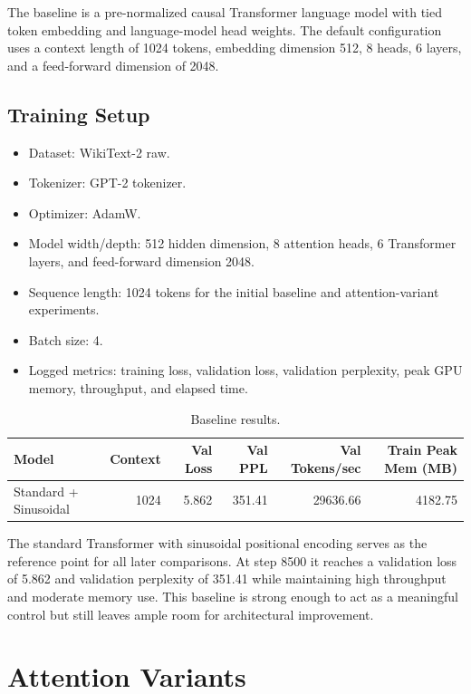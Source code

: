 \documentclass{article}
\begin{document}
The baseline is a pre-normalized causal Transformer language model with tied
token embedding and language-model head weights. The default configuration uses
a context length of 1024 tokens, embedding dimension 512, 8 heads, 6 layers, and
a feed-forward dimension of 2048.

\subsection{Training Setup}

\begin{itemize}
    \item Dataset: WikiText-2 raw.
    \item Tokenizer: GPT-2 tokenizer.
    \item Optimizer: AdamW.
    \item Model width/depth: 512 hidden dimension, 8 attention heads, 6 Transformer layers, and feed-forward dimension 2048.
    \item Sequence length: 1024 tokens for the initial baseline and attention-variant experiments.
    \item Batch size: 4.
    \item Logged metrics: training loss, validation loss, validation perplexity,
    peak GPU memory, throughput, and elapsed time.
\end{itemize}

\begin{table}[h]
\centering
\begin{tabular}{lrrrrr}
\toprule
Model & Context & Val Loss & Val PPL & Val Tokens/sec & Train Peak Mem (MB) \\
\midrule
Standard + Sinusoidal & 1024 & 5.862 & 351.41 & 29636.66 & 4182.75 \\
\bottomrule
\end{tabular}
\caption{Baseline results.}
\end{table}

The standard Transformer with sinusoidal positional encoding serves as the
reference point for all later comparisons. At step 8500 it reaches a validation
loss of 5.862 and validation perplexity of 351.41 while maintaining high
throughput and moderate memory use. This baseline is strong enough to act as a
meaningful control but still leaves ample room for architectural improvement.

\section{Attention Variants}
\end{document}
